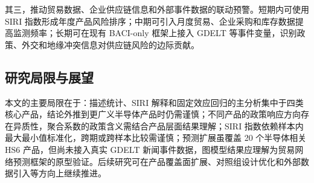 其三，推动贸易数据、企业供应链信息和外部事件数据的联动预警。短期内可使用 SIRI 指数形成年度产品风险排序；中期可引入月度贸易、企业采购和库存数据提高监测频率；长期可在现有 BACI-only 框架上接入 GDELT 等事件变量，识别政策、外交和地缘冲突信息对供应链风险的边际贡献。

\subsection{研究局限与展望}

本文的主要局限在于：描述统计、SIRI 解释和固定效应回归的主分析集中于四类核心产品，结论外推到更广义半导体产品时仍需谨慎；不同产品的政策响应方向存在异质性，聚合系数的政策含义需结合产品层面结果理解；SIRI 指数依赖样本内最大最小值标准化，跨期或跨样本比较需谨慎；预测扩展虽覆盖 20 个半导体相关 HS6 产品，但尚未接入真实 GDELT 新闻事件数据，图模型结果应理解为贸易网络预测框架的原型验证。后续研究可在产品覆盖面扩展、对照组设计优化和外部数据引入等方向上继续推进。
